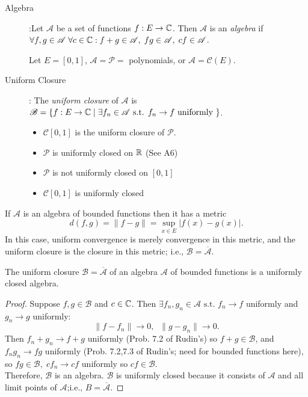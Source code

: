 \begin{define}[28]
	\hfill
	\begin{description}
		\item[Algebra]:Let $\mathscr{A}$ be a set of functions $f:E\to \mathbb{C}$. Then $\mathscr{A}$ is an \textit{algebra} if $\forall{f,g \in \mathscr{A}}\;\forall{c \in \ensuremath{\mathbb{C}}}: f+g \in \mathscr{A}, \; fg \in \mathscr{A}, \; cf \in \mathscr{A}$.
		      \begin{example}
			      Let $E=[0,1]$, $\mathscr{A}=\mathscr{P}=$ polynomials, or $\mathscr{A}=\mathscr{C}(E)$.
		      \end{example}
		\item[Uniform Closure]: The \textit{uniform closure} of $\mathscr{A}$ is $\mathscr{B}=\{f: E\to \mathbb{C} \;| \; \exists{f_{n} \in \mathscr{A}} \text{ s.t. } f_{n}\to f \text{ uniformly }\} $.
		      \begin{example}
			      \begin{itemize}
				      \item $\mathscr{C}[0,1]$ is the uniform closure of $\mathscr{P}$.
				      \item $\mathscr{P}$ is uniformly closed on $\mathbb{R}$ (See A6)
				      \item $\mathscr{P}$ is not uniformly closed on $[0,1]$
				      \item $\mathscr{C}[0,1]$ is uniformly closed
			      \end{itemize}
		      \end{example}
	\end{description}
	\begin{note}
		If $\mathscr{A}$ is an algebra of bounded functions then it has a metric
		\[
			d(f,g)= \|f-g\|=\sup_{x \in E}{\left|f(x)-g(x)\right|}
			.\]
		In this case, uniform convergence is merely convergence in this metric, and the uniform closure is the closure in this metric; i.e., $\mathscr{B}=\overline{\mathscr{A}}$.
	\end{note}
\end{define}
\begin{thm}[29]
	The uniform closure $\mathscr{B}=\mathbf{\overline{\mathscr{A}}}$ of an algebra $\mathscr{A}$ of bounded functions is a uniformly closed algebra.
	\begin{proof}
		Suppose $f,g \in \mathscr{B}$ and $c \in \mathbb{C}$. Then $\exists{f_{n},g_{n} \in \mathscr{A}} \text{ s.t. } f_{n}\to f$ uniformly and $g_{n}\to g$ uniformly:
		\[
			\|f-f_{n}\|	\to 0, \;\; \|g-g_{n}\|\to 0
			.\]
		Then $f_{n}+g_{n}\to f+g$ uniformly (Prob. 7.2 of Rudin's) so $f+g \in \mathscr{B}$, and $f_{n} g_{n} \to fg$ uniformly (Prob. 7.2,7.3 of Rudin's; need for bounded functions here), so $fg \in \mathscr{B},\; c f_n \to cf$ uniformly so $cf \in \mathscr{B}$.\\
		Therefore, $\mathscr{B}$ is an algebra.
		$\mathscr{B}$ is uniformly closed because it consists of $\mathscr{A}$ and all limit points of $\mathscr{A}$;i.e., $B=\overline{\mathscr{A}}$.
	\end{proof}
\end{thm}

